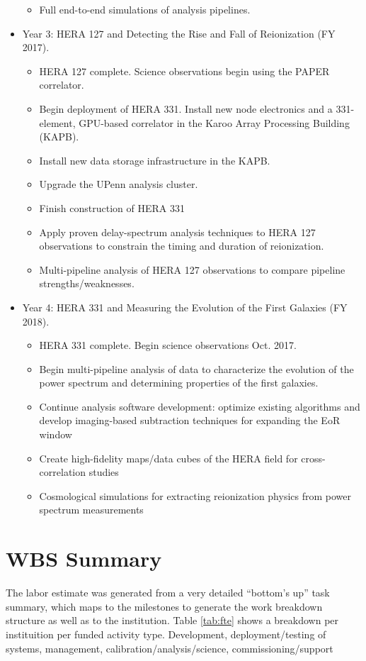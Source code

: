 \documentclass[preprint]{aastex}
\begin{document}
\begin{itemize}[itemsep=-4pt,parsep=-3pt]
\begin{itemize}[itemsep=-4pt]
\item Full end-to-end simulations of analysis pipelines.
\end{itemize}
\item Year 3:  HERA 127 and Detecting the Rise and Fall of Reionization (FY 2017). 
\begin{itemize}[itemsep=-4pt]
\item HERA 127 complete. Science observations begin using the PAPER correlator. 
\item Begin deployment of HERA 331. Install new node electronics and a 331-element, GPU-based correlator in the Karoo Array Processing Building (KAPB). 
\item Install new data storage infrastructure in the KAPB. 
\item Upgrade the UPenn analysis cluster. 
\item Finish construction of HERA 331
\item Apply proven delay-spectrum analysis techniques to HERA 127 observations to constrain the timing and duration of reionization. 
\item Multi-pipeline analysis of HERA 127 observations to compare pipeline strengths/weaknesses.
\end{itemize}
\item Year 4:  HERA 331 and Measuring the Evolution of the First Galaxies (FY 2018). 
\begin{itemize}[itemsep=-4pt]
\item HERA 331 complete. Begin science observations Oct. 2017. 
\item Begin multi-pipeline analysis of data to characterize the evolution of the power spectrum and determining properties of the first galaxies. 
\item Continue analysis software development: optimize existing algorithms and develop imaging-based subtraction techniques for expanding the EoR window
\item Create high-fidelity maps/data cubes of the HERA field for cross-correlation studies
\item Cosmological simulations for extracting reionization physics from power spectrum measurements
\end{itemize}
\end{itemize}

\section{WBS Summary}
\label{sec:wbs}
The labor estimate was generated from a very detailed ``bottom's up'' task summary, which maps to the milestones to generate the work breakdown structure as well as to the institution.  Table \ref{tab:fte}
shows a breakdown per instituition per funded activity type.  Development, deployment/testing of systems, management, calibration/analysis/science, commissioning/support
\end{document}
